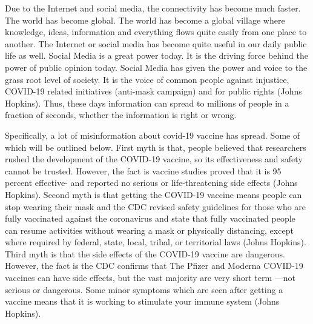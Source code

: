 \documentclass[10pt,twocolumn,letterpaper]{article}
\begin{document}
Due to the Internet and social media, the connectivity has become much faster. The world has become global. The world has become a global village where knowledge, ideas, information and everything flows quite easily from one place to another. The Internet or social media has become quite useful in our daily public life as well. Social Media is a great power today. It is the driving force behind the power of public opinion today. Social Media has given the power and voice to the grass root level of society. It is the voice of common people against injustice, COVID-19 related initiatives (anti-mask campaign) and for public rights (Johns Hopkins). Thus, these days information can spread to millions of people in a fraction of seconds, whether the information is right or wrong. 

Specifically, a lot of misinformation about covid-19 vaccine has spread. Some of which will be outlined below. First myth is that, people believed that researchers rushed  the development of the COVID-19 vaccine, so its effectiveness and safety cannot be trusted. However, the fact is  vaccine studies proved that it is 95 percent effective- and reported no serious or life-threatening side effects (Johns Hopkins). Second myth is that getting the COVID-19 vaccine means people can stop wearing their mask and the CDC revised safety guidelines for those who are fully vaccinated against the coronavirus and state that fully vaccinated people can resume activities without wearing a mask or physically distancing, except where required by federal, state, local, tribal, or territorial laws (Johns Hopkins). Third myth is that the side effects of the COVID-19 vaccine are dangerous. However, the fact is the CDC confirms that The Pfizer and Moderna COVID-19 vaccines can have side effects, but the vast majority are very short term —not serious or dangerous. Some minor symptoms which are seen after getting a vaccine means that it is working to stimulate your immune system (Johns Hopkins). 
\end{document}
